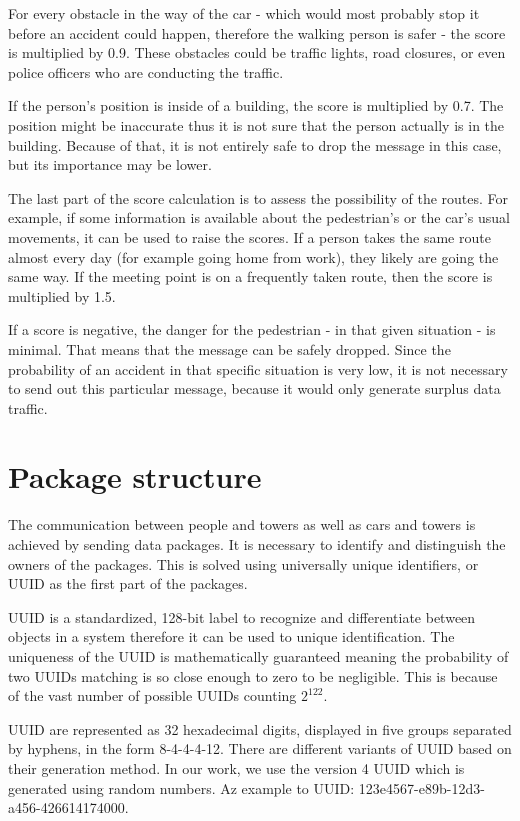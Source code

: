 \documentclass[conference]{IEEEtran}
\begin{document}
For every obstacle in the way of the car - which would most probably stop it before an accident could happen, therefore the walking person is safer - the score is multiplied by 0.9. These obstacles could be traffic lights, road closures, or even police officers who are conducting the traffic.

If the person’s position is inside of a building, the score is multiplied by 0.7. The position might be inaccurate thus it is not sure that the person actually is in the building. Because of that, it is not entirely safe to drop the message in this case, but its importance may be lower.

The last part of the score calculation is to assess the possibility of the routes. For example, if some information is available about the pedestrian's or the car's usual movements, it can be used to raise the scores. If a person takes the same route almost every day (for example going home from work), they likely are going the same way. If the meeting point is on a frequently taken route, then the score is multiplied by 1.5.

If a score is negative, the danger for the pedestrian - in that given situation - is minimal. That means that the message can be safely dropped. Since the probability of an accident in that specific situation is very low, it is not necessary to send out this particular message, because it would only generate surplus data traffic.

\section{Package structure}

The communication between people and towers as well as cars and towers is achieved by sending data packages. It is necessary to identify and distinguish the owners of the packages. This is solved using universally unique identifiers, or UUID as the first part of the packages.

UUID is a standardized, 128-bit label to recognize and differentiate between objects in a system therefore it can be used to unique identification. The uniqueness of the UUID is mathematically guaranteed meaning the probability of two UUIDs matching is so close enough to zero to be negligible. This is because of the vast number of possible UUIDs counting $2^{122}$.

UUID are represented as 32 hexadecimal digits, displayed in five groups separated by hyphens, in the form 8-4-4-4-12. There are different variants of UUID based on their generation method. In our work, we use the version 4 UUID which is generated using random numbers. Az example to UUID: 123e4567-e89b-12d3-a456-426614174000.
\end{document}
